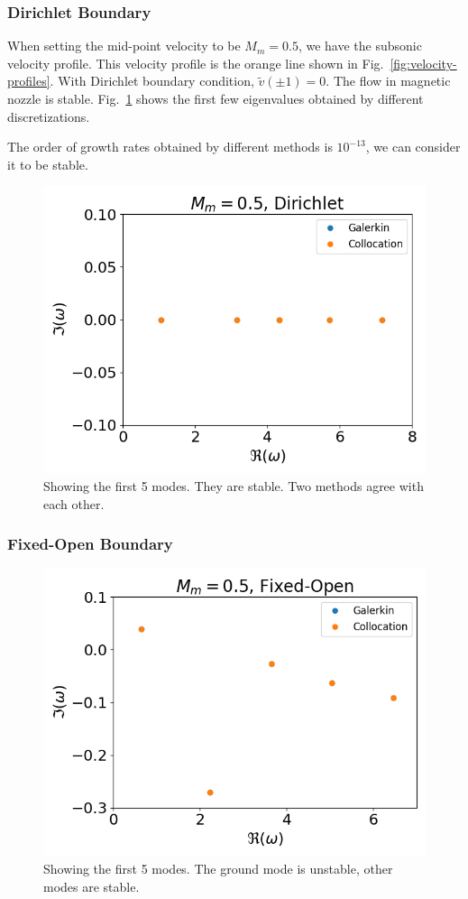 \subsubsection*{Dirichlet Boundary}
When setting the mid-point velocity to be $M_m=0.5$, we have the subsonic velocity profile. This velocity profile is the orange line shown in Fig.~\ref{fig:velocity-profiles}. With Dirichlet boundary condition, $\tilde{v}(\pm 1) =0$. The flow in magnetic nozzle is stable. Fig.~\ref{fig:subsonic-dirichlet} shows the first few eigenvalues obtained by different discretizations.

The order of growth rates obtained by different methods is $10^{-13}$, we can consider it to be stable.
\begin{figure} [H]
	\centering
	\includegraphics[width=0.7\linewidth]{figures/subsonic-drichlet.png}
	\caption{Showing the first 5 modes. They are stable. Two methods agree with each other.}
	\label{fig:subsonic-dirichlet}
\end{figure}

\subsubsection*{Fixed-Open Boundary}
\begin{figure} [H]
	\centering
	\includegraphics[width=0.7\linewidth]{figures/subsonic-fixed-open.png}
	\caption{Showing the first 5 modes. The ground mode is unstable, other modes are stable.}
	\label{fig:subsonic-fixed-open}
\end{figure}


